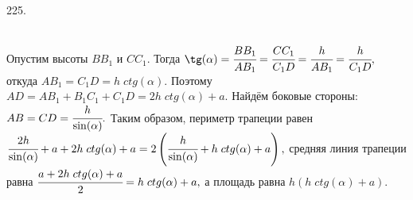 225. \begin{figure}[ht!]
\end{figure}\\
Опустим высоты $BB_1$ и $CC_1.$ Тогда $\tg(\alpha)=\cfrac{BB_1}{AB_1}=\cfrac{CC_1}{C_1D}=\cfrac{h}{AB_1}=\cfrac{h}{C_1D},$ откуда $AB_1=C_1D=h\; ctg(\alpha).$ Поэтому $AD=AB_1+B_1C_1+C_1D=2h\; ctg(\alpha)+a.$ Найдём боковые стороны: $AB=CD=\cfrac{h}{\sin(\alpha)}.$ Таким образом, периметр трапеции равен $\cfrac{2h}{\sin(\alpha)}+a+2h\; ctg(\alpha)+a=2\left(\cfrac{h}{\sin(\alpha)}+h\; ctg(\alpha)+a\right),$ средняя линия трапеции равна $\cfrac{a+2h\; ctg(\alpha)+a}{2}=h\; ctg(\alpha)+a,$ а площадь равна $h(h\; ctg(\alpha)+a).$\\
